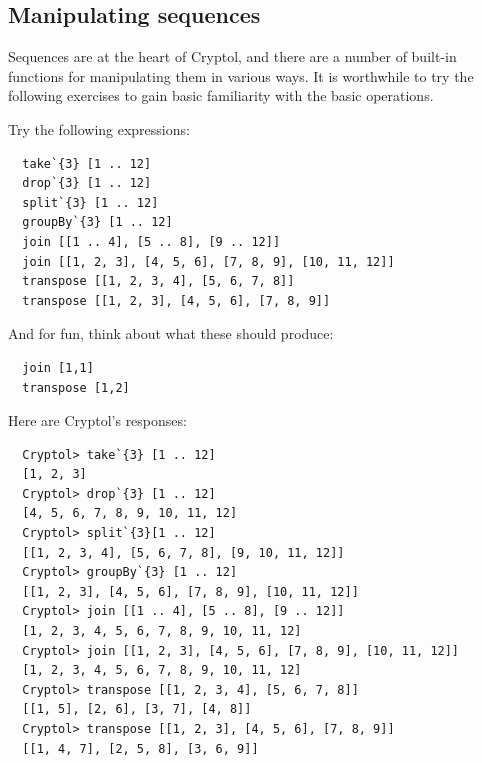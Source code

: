 \subsection{Manipulating sequences} 
\label{sec:manip-sequ}

Sequences are at the heart of Cryptol, and there are a number of
built-in functions for manipulating them in various ways.  It is
worthwhile to try the following exercises to gain basic familiarity
with the basic operations.

\begin{Exercise}\label{ex:seq:11}
Try the following expressions:\indTake\indDrop\indSplit\indGroup\indJoin\indTranspose
\begin{Verbatim}
  take`{3} [1 .. 12]
  drop`{3} [1 .. 12]
  split`{3} [1 .. 12]
  groupBy`{3} [1 .. 12]
  join [[1 .. 4], [5 .. 8], [9 .. 12]]
  join [[1, 2, 3], [4, 5, 6], [7, 8, 9], [10, 11, 12]]
  transpose [[1, 2, 3, 4], [5, 6, 7, 8]]
  transpose [[1, 2, 3], [4, 5, 6], [7, 8, 9]]
\end{Verbatim}
And for fun, think about what these should produce:
\begin{Verbatim}
  join [1,1]
  transpose [1,2]
\end{Verbatim}
\end{Exercise}
\begin{Answer}
Here are Cryptol's responses:
\begin{Verbatim}
  Cryptol> take`{3} [1 .. 12]
  [1, 2, 3]
  Cryptol> drop`{3} [1 .. 12]
  [4, 5, 6, 7, 8, 9, 10, 11, 12]
  Cryptol> split`{3}[1 .. 12]
  [[1, 2, 3, 4], [5, 6, 7, 8], [9, 10, 11, 12]]
  Cryptol> groupBy`{3} [1 .. 12]
  [[1, 2, 3], [4, 5, 6], [7, 8, 9], [10, 11, 12]]
  Cryptol> join [[1 .. 4], [5 .. 8], [9 .. 12]]
  [1, 2, 3, 4, 5, 6, 7, 8, 9, 10, 11, 12]
  Cryptol> join [[1, 2, 3], [4, 5, 6], [7, 8, 9], [10, 11, 12]]
  [1, 2, 3, 4, 5, 6, 7, 8, 9, 10, 11, 12]
  Cryptol> transpose [[1, 2, 3, 4], [5, 6, 7, 8]]
  [[1, 5], [2, 6], [3, 7], [4, 8]]
  Cryptol> transpose [[1, 2, 3], [4, 5, 6], [7, 8, 9]]
  [[1, 4, 7], [2, 5, 8], [3, 6, 9]]
\end{Verbatim}
\end{Answer}

